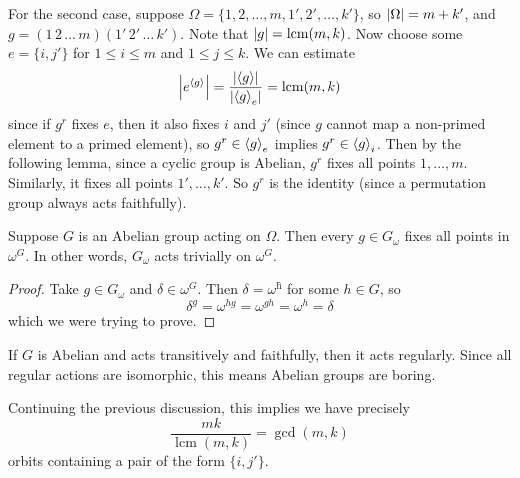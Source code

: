 For the second case, suppose $\Omega = \{ 1, 2, \ldots, m, 1', 2', \ldots, k'
\}$, so $\left| \Omega \right| = m+k'$, and $g = (1\,2\,\ldots\,m) (1'\,2'\,\ldots\,k')$.
Note that $\left| g \right| = \operatorname{lcm}(m, k)$.
Now choose some $e = \{i, j'\}$ for $1 \le i \le m$ and $1 \le j \le k$.
We can estimate
\[
  \left| e^{\left< g \right>} \right|
  = \frac{\left| \left< g \right> \right|}{\left| \left< g \right>_e \right|}
  = \operatorname{lcm}(m, k)
\]
since if $g^r$ fixes $e$, then it also fixes $i$ and $j'$ (since $g$ cannot map
a non-primed element to a primed element), so $g^r \in \left< g \right>_e$ implies $g^r
\in \left< g \right>_i$.
Then by the following lemma, since a cyclic group is Abelian, $g^r$ fixes all
points $1, \ldots, m$.
Similarly, it fixes all points $1', \ldots, k'$.
So $g^r$ is the identity (since a permutation group always acts faithfully).

\begin{lemma}
  Suppose $G$ is an Abelian group acting on $\Omega$.
  Then every $g \in G_\omega$ fixes all points in $\omega^G$.
  In other words, $G_\omega$ acts trivially on $\omega^G$.
\end{lemma}

\begin{proof}
  Take $g \in G_\omega$ and $\delta \in \omega^G$.
  Then $\delta = \omega^ĥ$ for some $h \in G$, so
  \[
	\delta^g = \omega^{hg} = \omega^{gh} = \omega^h = \delta
  \]
  which we were trying to prove.
\end{proof}

\begin{remark}
  If $G$ is Abelian and acts transitively and faithfully, then it acts
  regularly.
  Since all regular actions are isomorphic, this means Abelian groups are
  boring.
\end{remark}

Continuing the previous discussion, this implies we have precisely
\[
  \frac{mk}{\operatorname{lcm}(m,k)} = \operatorname{gcd}(m, k)
\]
orbits containing a pair of the form $\{i, j'\}$.

